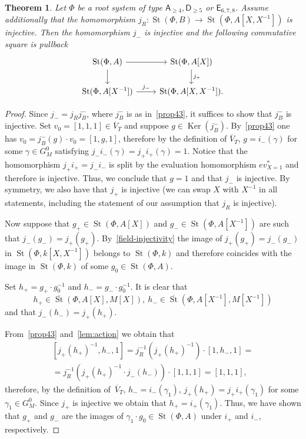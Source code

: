 \documentclass[oneside, 8pt]{amsart}
\newtheorem{theorem}{Theorem}
\theoremstyle{remark}
\theoremstyle{definition}
\numberwithin{lemma}{section}
\numberwithin{prop}{section}
\numberwithin{corollary}{section}
\numberwithin{externaltheorem}{section}
\DeclareMathOperator{\Ker}{Ker}
\DeclareMathOperator{\St}{St}
\newcommand{\inv}{^{-1}}
\newcommand{\rA}{\mathsf{A}}
\newcommand{\rD}{\mathsf{D}}
\newcommand{\rE}{\mathsf{E}}
\numberwithin{equation}{section}
\begin{document}
\begin{theorem} \label{thm:P1glueing}
 Let $\Phi$ be a root system of type $\rA_{\geq 4}, \rD_{\geq 5}$ or $\rE_{6,7,8}$.
 Assume additionally that the homomorphism $j_R \colon \St(\Phi, B) \to \St(\Phi, A[X, X\inv])$ is injective.  
 Then the homomorphism $j_-$ is injective and the following commutative square is pullback
 \[ \begin{tikzcd} \St(\Phi, A) \arrow{r} \arrow{d} & \St(\Phi, A[X]) \arrow{d}{j_+} \\ \St(\Phi, A[X\inv]) \arrow{r}{j_-} & \St(\Phi, A[X, X\inv]). \end{tikzcd} \] 
\end{theorem}
\begin{proof} Since $j_- = j_R j_B^-$, where $j_B^-$ is as in~\cref{prop43}, it suffices to show that $j_B^-$ is injective.
 Set $v_0 = [1, 1, 1] \in \overline{V}_T$ and suppose $g \in \Ker(j_B^-)$.
 By~\cref{prop43} one has $v_0 = j_B^-(g) \cdot v_0 = [1, g, 1]$, therefore by the definition of $\overline{V}_T$, $g = i_-(\gamma)$ for some $\gamma \in G_M^0$ satisfying $j_-i_-(\gamma) = j_+i_+(\gamma) = 1$.
 Notice that the homomorphism $j_+i_+ = j_-i_-$ is split by the evaluation homomorphism $ev_{X=1}^*$ and therefore is injective. Thus, we conclude that $g = 1$ and that $j_-$ is injective. By symmetry, we also have that $j_+$ is injective (we can swap $X$ with $X^{-1}$ in all statements, including the statement of our assumption that $j_R$ is injective).
 
 Now suppose that $g_+ \in \St(\Phi, A[X])$ and $g_- \in \St(\Phi, A[X\inv])$ are such that $j_-(g_-) = j_+(g_+)$.
 By~\cref{field-injectivity} the image of $j_+(g_+) = j_-(g_-)$ in $\St(\Phi, k[X, X\inv])$ belongs to $\St(\Phi, k)$ and therefore coincides with the image in $\St(\Phi, k)$ of some $g_0 \in \St(\Phi, A)$.
 
 Set $h_+ = g_+\cdot g_0^{-1}$ and $h_- = g_- \cdot g_0^{-1}$.
 It is clear that \[ h_+ \in \overline{\St}(\Phi, A[X], M[X]),\ h_- \in \overline{\St}(\Phi, A[X\inv], M[X\inv])\]
 and that $j_-(h_-) = j_+(h_+).$
 
 From~\cref{prop43} and~\cref{lem:action} we obtain that
 \begin{multline} \nonumber [j_+(h_+)^{-1}, h_-, 1] = j_R^{-1}(j_+(h_+)^{-1}) \cdot [1, h_-, 1] = \\ = j_R^{-1}(j_+(h_+)^{-1} \cdot j_-(h_-)) \cdot [1, 1, 1] = [1, 1, 1], \end{multline} therefore, by the definition of~$\overline{V}_T$, $h_- = i_-(\gamma_1)$, $j_+(h_+) = j_+i_+(\gamma_1)$ for some $\gamma_1 \in G_M^0$. Since $j_+$ is injective we obtain that $h_+ = i_+(\gamma_1)$. Thus, we have shown that $g_+$ and $g_-$ are the images of $\gamma_1 \cdot g_0 \in \St(\Phi, A)$ under $i_+$ and $i_-$, respectively.
 \end{proof}
  
\end{document}
